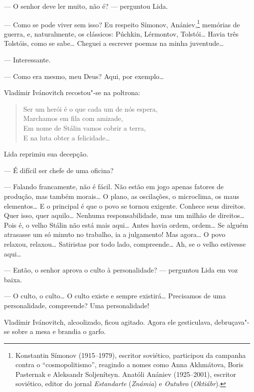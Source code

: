 --- O senhor deve ler muito, não é? --- perguntou Lida.

--- Como se pode viver sem isso? Eu respeito Símonov, Anániev,\footnote{Konstantin
  Símonov (1915--1979), escritor soviético, participou da campanha
  contra o ``cosmopolitismo'', reagindo a nomes como Anna Akhmátova,
  Boris Pasternak e Aleksandr Soljenítsyn. Anatóli Anániev (1925--2001),
  escritor soviético, editor do jornal \emph{Estandarte} (\emph{Známia})
  e \emph{Outubro} (\emph{Oktiábr}).} memórias de guerra, e,
naturalmente, os clássicos: Púchkin, Lérmontov, Tolstói\ldots{} Havia três
Tolstóis, como se sabe\ldots{} Cheguei a escrever poemas na minha
juventude\ldots{}

--- Interessante.

--- Como era mesmo, meu Deus? Aqui, por exemplo\ldots{}

Vladímir Ivánovitch recostou"-se na poltrona:

\begin{verse}
Ser um herói é o que cada um de nós espera,\\
Marchamos em fila com amizade,\\
Em nome de Stálin vamos cobrir a terra,\\
E na luta obter a felicidade\ldots{}
\end{verse}

Lida reprimiu sua decepção.

--- É difícil ser chefe de uma oficina?

--- Falando francamente, não é fácil. Não estão em jogo apenas fatores
de produção, mas também morais\ldots{} O plano, as oscilações, o microclima,
os maus elementos\ldots{} E o principal é que o povo se tornou exigente.
Conhece seus direitos. Quer isso, quer aquilo\ldots{} Nenhuma
responsabilidade, mas um milhão de direitos\ldots{} Pois é, o velho Stálin
não está mais aqui\ldots{} Antes havia ordem, ordem\ldots{} Se alguém atrasasse um
só minuto no trabalho, ia a julgamento! Mas agora\ldots{} O povo relaxou,
relaxou\ldots{} Satiristas por todo lado, compreende\ldots{} Ah, se o velho
estivesse aqui\ldots{}

--- Então, o senhor aprova o culto à personalidade? --- perguntou Lida
em voz baixa.

--- O culto, o culto\ldots{} O culto existe e sempre existirá\ldots{} Precisamos
de uma personalidade, compreende? Uma personalidade!

Vladímir Ivánovitch, alcoolizado, ficou agitado. Agora ele gesticulava,
debruçava"-se sobre a mesa e brandia o garfo.

